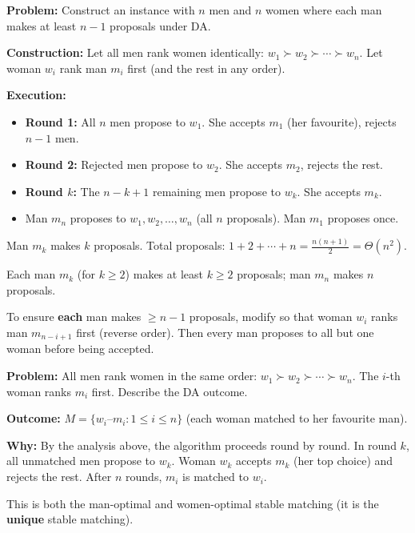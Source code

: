 \begin{exbox}
\textbf{Problem:} Construct an instance with $n$ men and $n$ women where each man makes at least $n - 1$ proposals under DA.

\textbf{Construction:} Let all men rank women identically: $w_1 \succ w_2 \succ \cdots \succ w_n$. Let woman $w_i$ rank man $m_i$ first (and the rest in any order).

\textbf{Execution:}
\begin{itemize}
  \item \textbf{Round 1:} All $n$ men propose to $w_1$. She accepts $m_1$ (her favourite), rejects $n-1$ men.
  \item \textbf{Round 2:} Rejected men propose to $w_2$. She accepts $m_2$, rejects the rest.
  \item \textbf{Round $k$:} The $n - k + 1$ remaining men propose to $w_k$. She accepts $m_k$.
  \item Man $m_n$ proposes to $w_1, w_2, \ldots, w_n$ (all $n$ proposals). Man $m_1$ proposes once.
\end{itemize}

Man $m_k$ makes $k$ proposals. Total proposals: $1 + 2 + \cdots + n = \frac{n(n+1)}{2} = \Theta(n^2)$.

Each man $m_k$ (for $k \geq 2$) makes at least $k \geq 2$ proposals; man $m_n$ makes $n$ proposals.

To ensure \textbf{each} man makes $\geq n-1$ proposals, modify so that woman $w_i$ ranks man $m_{n-i+1}$ first (reverse order). Then every man proposes to all but one woman before being accepted.
\end{exbox}

\begin{exbox}
\textbf{Problem:} All men rank women in the same order: $w_1 \succ w_2 \succ \cdots \succ w_n$. The $i$-th woman ranks $m_i$ first. Describe the DA outcome.

\textbf{Outcome:} $M = \{w_i\text{--}m_i : 1 \leq i \leq n\}$ (each woman matched to her favourite man).

\textbf{Why:} By the analysis above, the algorithm proceeds round by round. In round $k$, all unmatched men propose to $w_k$. Woman $w_k$ accepts $m_k$ (her top choice) and rejects the rest. After $n$ rounds, $m_i$ is matched to $w_i$.

This is both the man-optimal and women-optimal stable matching (it is the \textbf{unique} stable matching).
\end{exbox}

